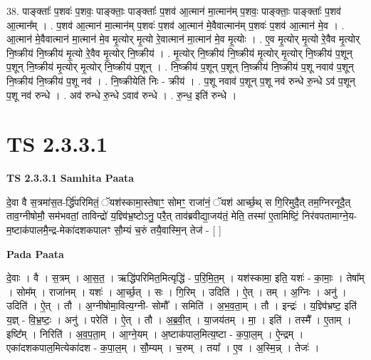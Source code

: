 \documentclass[17pt]{extarticle}
\begin{document}
38. पाङ्क्ताः᳚ प॒शवः॑ प॒शवः॒ पाङ्क्ताः॒ पाङ्क्ताः᳚ प॒शव॑ आ॒त्मान॑ मा॒त्मान॑म् प॒शवः॒ पाङ्क्ताः॒ पाङ्क्ताः᳚ प॒शव॑ आ॒त्मान᳚म् । . प॒शव॑ आ॒त्मान॑ मा॒त्मान॑म् प॒शवः॑ प॒शव॑ आ॒त्मान॑ मे॒वैवात्मान॑म् प॒शवः॑ प॒शव॑ आ॒त्मान॑ मे॒व । . आ॒त्मान॑ मे॒वैवात्मान॑ मा॒त्मान॑ मे॒व मृ॒त्योर् मृ॒त्यो रे॒वात्मान॑ मा॒त्मान॑ मे॒व मृ॒त्योः । . ए॒व मृ॒त्योर् मृ॒त्यो रे॒वैव मृ॒त्योर् नि॒ष्क्रीय॑ नि॒ष्क्रीय॑ मृ॒त्यो रे॒वैव मृ॒त्योर् नि॒ष्क्रीय॑ । . मृ॒त्योर् नि॒ष्क्रीय॑ नि॒ष्क्रीय॑ मृ॒त्योर् मृ॒त्योर् नि॒ष्क्रीय॑ प॒शून् प॒शून् नि॒ष्क्रीय॑ मृ॒त्योर् मृ॒त्योर् नि॒ष्क्रीय॑ प॒शून् । . नि॒ष्क्रीय॑ प॒शून् प॒शून् नि॒ष्क्रीय॑ नि॒ष्क्रीय॑ प॒शू नवाव॑ प॒शून् नि॒ष्क्रीय॑ नि॒ष्क्रीय॑ प॒शू नव॑ । . नि॒ष्क्रीयेति॑ निः - क्रीय॑ । . प॒शू नवाव॑ प॒शून् प॒शू नव॑ रुन्धे रु॒न्धे ऽव॑ प॒शून् प॒शू नव॑ रुन्धे । . अव॑ रुन्धे रु॒न्धे ऽवाव॑ रुन्धे । . रु॒न्ध॒ इति॑ रुन्धे । \newline
\pagebreak
{}
\section*{ TS 2.3.3.1 }

\textbf{TS 2.3.3.1 } \newline
\textbf{Samhita Paata} \newline

दे॒वा वै स॒त्रमा॑स॒त-र्द्धि॑परिमितं॒ ॅयश॑स्कामा॒स्तेषाꣳ॒॒ सोमꣳ॒॒ राजा॑नं॒ ॅयश॑ आर्च्छ॒थ् स गि॒रिमुदै॒त् तम॒ग्निरनूदै॒त् ताव॒ग्नीषोमौ॒ सम॑भवतां॒ ताविन्द्रो॑ य॒ज्ञ्वि॑भ्र॒ष्टोऽनु॒ परै॒त् ताव॑ब्रवीद्या॒जय॑तं॒ मेति॒ तस्मा॑ ए॒तामिष्टिं॒ निर॑वपतामाग्ने॒य-म॒ष्टाक॑पालमै॒न्द्र-मेका॑दशकपालꣳ सौ॒म्यं च॒रुं तयै॒वास्मि॒न् तेज॑ - [  ] \newline

\textbf{Pada Paata} \newline

दे॒वाः । वै । स॒त्रम् । आ॒स॒त॒ । ऋद्धि॑परिमित॒मित्यृद्धि॑ - प॒रि॒मि॒त॒म् । यश॑स्कामा॒ इति॒ यशः॑ - का॒माः॒ । तेषा᳚म् । सोम᳚म् । राजा॑नम् । यशः॑ । आ॒र्च्छ॒त् । सः । गि॒रिम् । उदिति॑ । ऐ॒त् । तम् । अ॒ग्निः । अनु॑ । उदिति॑ । ऐ॒त् । तौ । अ॒ग्नीषोमा॒वित्य॒ग्नी- सोमौ᳚ । समिति॑ । अ॒भ॒व॒ता॒म् । तौ । इन्द्रः॑ । य॒ज्ञ्वि॑भ्रष्ट॒ इति॑ य॒ज्ञ् - वि॒भ्र॒ष्टः॒ । अनु॑ । परेति॑ । ऐ॒त् । तौ । अ॒ब्र॒वी॒त् । या॒जय॑तम् । मा॒ । इति॑ । तस्मै᳚ । ए॒ताम् । इष्टि᳚म् । निरिति॑ । अ॒व॒प॒ता॒म् । आ॒ग्ने॒यम् । अ॒ष्टाक॑पाल॒मित्य॒ष्टा - क॒पा॒ल॒म् । ऐ॒न्द्रम् । एका॑दशकपाल॒मित्येका॑दश - क॒पा॒ल॒म् । सौ॒म्यम् । च॒रुम् । तया᳚ । ए॒व । अ॒स्मि॒न्न् । तेजः॑ ।  \newline
\end{document}
